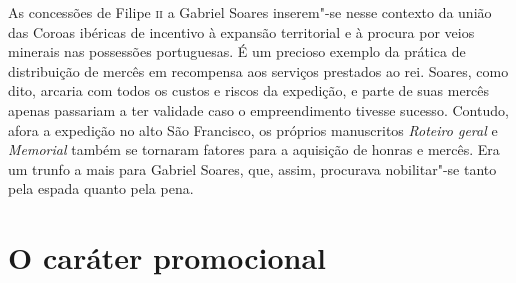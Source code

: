 As concessões de Filipe \textsc{ii} a Gabriel Soares inserem"-se nesse contexto da
união das Coroas ibéricas de incentivo à expansão territorial e à
procura por veios minerais nas possessões portuguesas. É um precioso
exemplo da prática de distribuição de mercês em recompensa aos serviços
prestados ao rei. Soares, como dito, arcaria com todos os custos e
riscos da expedição, e parte de suas mercês apenas passariam a ter
validade caso o empreendimento tivesse sucesso. Contudo, afora a
expedição no alto São Francisco, os próprios manuscritos
\textit{Roteiro geral} e \textit{Memorial} também se tornaram fatores
para a aquisição de honras e mercês. Era um trunfo a mais para Gabriel
Soares, que, assim, procurava nobilitar"-se tanto pela espada quanto
pela pena.

\section*{O caráter promocional}

